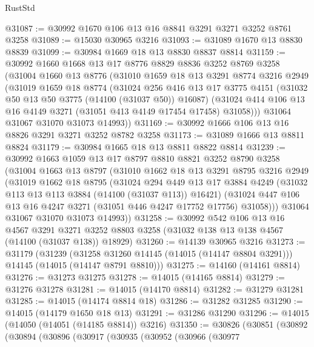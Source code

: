 \begin{lexlean}{RustStd}
\begin{coremodule}
@31087 := @30992 @1670 @106 @13 @16 @8841 @3291 @3271 @3252 @8761 @3258
@31089 := @15030 @30965 @3216
@31093 := @31089 @1670 @13 @8830 @8839
@31099 := @30984 @1669 @18 @13 @8830 @8837 @8814
@31159 := @30992
    @1660
    @1668
    @13
    @17
    @8776
    @8829
    @8836
    @3252
    @8769
    @3258
    (@31004
      @1660
      @13
      @8776
      (@31010
        @1659
        @18
        @13
        @3291
        @8774
        @3216
        @2949
        (@31019
          @1659
          @18
          @8774
          (@31024
            @256
            @416
            @13
            @17
            @3775
            @4151
            (@31032 @50 @13 @50 @3775 (@14100 (@31037 @50)) @16087)
            (@31024 @414 @106 @13 @16 @4149 @3271 (@31051 @413 @4149 @17454 @17458) @31058)))
        @31064
        @31067
        @31070
        @31073
        @14993))
@31169 := @30992 @1666 @106 @13 @16 @8826 @3291 @3271 @3252 @8782 @3258
@31173 := @31089 @1666 @13 @8811 @8824
@31179 := @30984 @1665 @18 @13 @8811 @8822 @8814
@31239 := @30992
    @1663
    @1059
    @13
    @17
    @8797
    @8810
    @8821
    @3252
    @8790
    @3258
    (@31004
      @1663
      @13
      @8797
      (@31010
        @1662
        @18
        @13
        @3291
        @8795
        @3216
        @2949
        (@31019
          @1662
          @18
          @8795
          (@31024
            @294
            @449
            @13
            @17
            @3884
            @4249
            (@31032 @113 @13 @113 @3884 (@14100 (@31037 @113)) @16421)
            (@31024 @447 @106 @13 @16 @4247 @3271 (@31051 @446 @4247 @17752 @17756) @31058)))
        @31064
        @31067
        @31070
        @31073
        @14993))
@31258 := @30992
    @542
    @106
    @13
    @16
    @4567
    @3291
    @3271
    @3252
    @8803
    @3258
    (@31032 @138 @13 @138 @4567 (@14100 (@31037 @138)) @18929)
@31260 := @14139 @30965 @3216
@31273 := @31179
    (@31239
      (@31258 @31260 @14145 (@14015 (@14147 @8804 @3291)))
      @14145
      (@14015 (@14147 @8791 @8810)))
@31275 := @14160 (@14161 @8814)
@31276 := @31273 @31275
@31278 := @14015 (@14165 @8814)
@31279 := @31276 @31278
@31281 := @14015 (@14170 @8814)
@31282 := @31279 @31281
@31285 := @14015 (@14174 @8814 @18)
@31286 := @31282 @31285
@31290 := @14015 (@14179 @1650 @18 @13)
@31291 := @31286 @31290
@31296 := @14015 (@14050 (@14051 (@14185 @8814)) @3216)
@31350 := @30826
    (@30851
      (@30892
        (@30894
          (@30896
            (@30917
              (@30935
                (@30952
                  (@30966
                    (@30977

\end{coremodule}
\end{lexlean}
